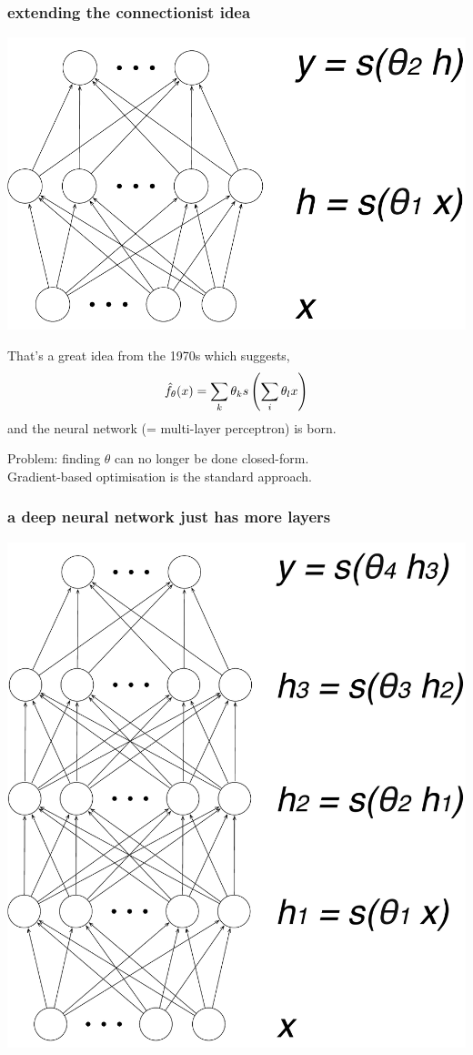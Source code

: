 \documentclass[USenglish,pdftex,compress,10pt,svgnamesi]{beamer}%
\begin{document}
\begin{frame}
\frametitle{extending the connectionist idea}
\includegraphics[scale=0.3]{nn1.pdf}

That's a great idea from the 1970s which suggests,
$$\hat{f}_\theta(x) = \sum_k \theta_k s \left(\sum_i \theta_l x\right)$$
and the neural network (= multi-layer perceptron) is born.

Problem: finding $\theta$ can no longer be done closed-form.\\
Gradient-based optimisation is the standard approach.
\end{frame}


\begin{frame}
\frametitle{a deep neural network just has more layers}
\includegraphics[scale=0.3]{nn3.pdf}
\end{frame}
\end{document}
